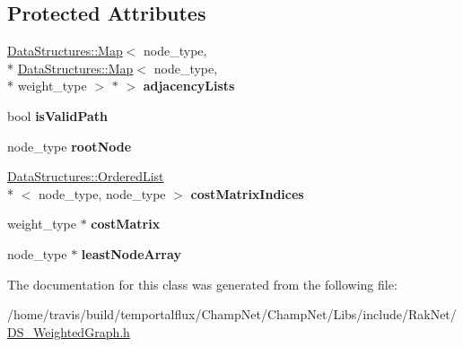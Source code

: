 \subsection*{Protected Attributes}
\begin{DoxyCompactItemize}
\item 
\hypertarget{class_data_structures_1_1_weighted_graph_a9b7213f0f01a226cd7033d4a84b7cdf8}{\hyperlink{class_data_structures_1_1_map}{Data\-Structures\-::\-Map}$<$ node\-\_\-type, \\*
\hyperlink{class_data_structures_1_1_map}{Data\-Structures\-::\-Map}$<$ node\-\_\-type, \\*
weight\-\_\-type $>$ $\ast$ $>$ {\bfseries adjacency\-Lists}}\label{class_data_structures_1_1_weighted_graph_a9b7213f0f01a226cd7033d4a84b7cdf8}

\item 
\hypertarget{class_data_structures_1_1_weighted_graph_ac48608c2c44bfa4f9655c05eddd56940}{bool {\bfseries is\-Valid\-Path}}\label{class_data_structures_1_1_weighted_graph_ac48608c2c44bfa4f9655c05eddd56940}

\item 
\hypertarget{class_data_structures_1_1_weighted_graph_a2f42d391d260dabc17b2c6096753839a}{node\-\_\-type {\bfseries root\-Node}}\label{class_data_structures_1_1_weighted_graph_a2f42d391d260dabc17b2c6096753839a}

\item 
\hypertarget{class_data_structures_1_1_weighted_graph_ac034f7d08bcf8f4c63fe4f5e7d888cd9}{\hyperlink{class_data_structures_1_1_ordered_list}{Data\-Structures\-::\-Ordered\-List}\\*
$<$ node\-\_\-type, node\-\_\-type $>$ {\bfseries cost\-Matrix\-Indices}}\label{class_data_structures_1_1_weighted_graph_ac034f7d08bcf8f4c63fe4f5e7d888cd9}

\item 
\hypertarget{class_data_structures_1_1_weighted_graph_a121ddaacaed31a2ad5e3f5313f3561d0}{weight\-\_\-type $\ast$ {\bfseries cost\-Matrix}}\label{class_data_structures_1_1_weighted_graph_a121ddaacaed31a2ad5e3f5313f3561d0}

\item 
\hypertarget{class_data_structures_1_1_weighted_graph_a685964d9ffea0f84739693b569db80fa}{node\-\_\-type $\ast$ {\bfseries least\-Node\-Array}}\label{class_data_structures_1_1_weighted_graph_a685964d9ffea0f84739693b569db80fa}

\end{DoxyCompactItemize}


The documentation for this class was generated from the following file\-:\begin{DoxyCompactItemize}
\item 
/home/travis/build/temportalflux/\-Champ\-Net/\-Champ\-Net/\-Libs/include/\-Rak\-Net/\hyperlink{_d_s___weighted_graph_8h}{D\-S\-\_\-\-Weighted\-Graph.\-h}\end{DoxyCompactItemize}
